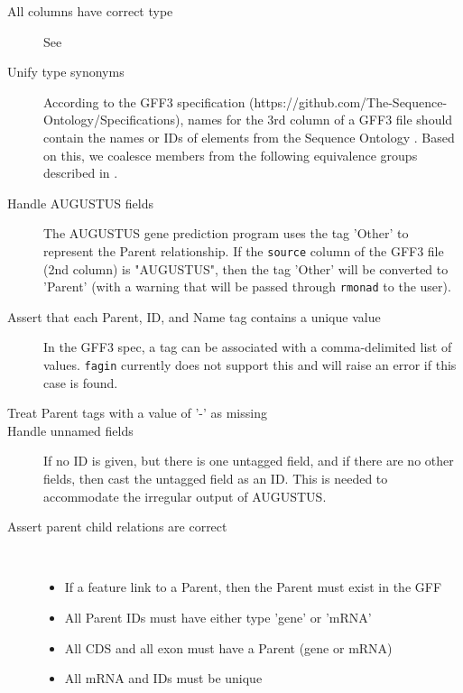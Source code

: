 \begin{description}
  \item[All columns have correct type] See 
  \item[Unify type synonyms] According to the GFF3 specification
    (https://github.com/The-Sequence-Ontology/Specifications), names for the
    3rd column of a GFF3 file should contain the names or IDs of elements from
    the Sequence Ontology \cite{eilbeck2005sequence}. Based on this, we
    coalesce members from the following equivalence groups described in
    .
  \item[Handle AUGUSTUS fields] The AUGUSTUS gene prediction program uses the
    tag 'Other' to represent the Parent relationship. If the {\tt source}
    column of the GFF3 file (2nd column) is "AUGUSTUS", then the tag 'Other'
    will be converted to 'Parent' (with a warning that will be passed through
    {\tt rmonad} to the user).
  \item[Assert that each Parent, ID, and Name tag contains a unique value] In
    the GFF3 spec, a tag can be associated with a comma-delimited list of
    values. {\tt fagin} currently does not support this and will raise an error
    if this case is found.
  \item[Treat Parent tags with a value of '-' as missing]
  \item[Handle unnamed fields] If no ID is given, but there is one untagged
    field, and if there are no other fields, then cast the untagged field as an
    ID. This is needed to accommodate the irregular output of AUGUSTUS.
  \item[Assert parent child relations are correct] \
  \begin{itemize}
    \item If a feature link to a Parent, then the Parent must exist in the GFF
    \item All Parent IDs must have either type 'gene' or 'mRNA'
    \item All CDS and all exon must have a Parent (gene or mRNA) 
    \item All mRNA and IDs must be unique
  \end{itemize}
\end{description}

